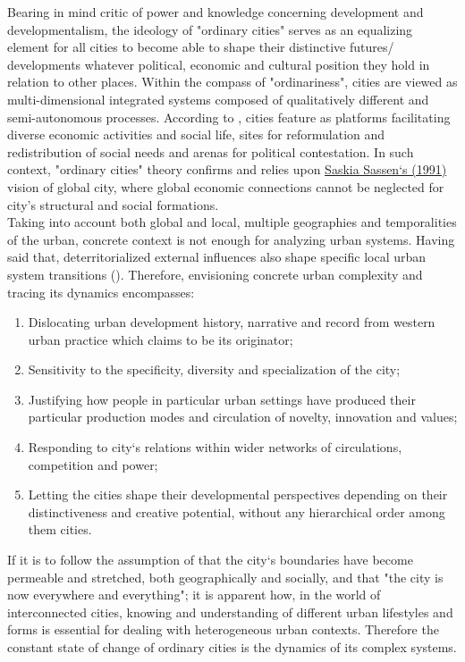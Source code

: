 \documentclass[11pt]{report}
\begin{document}
Bearing  in  mind  \href{Escobar}{\citealt{escobar_encountering_1995}} critic  of  power  and  knowledge  concerning  development  and developmentalism, the  ideology  of  "ordinary  cities"  serves as an equalizing  element  for  all  cities  to  become  able  to  shape  their  distinctive  futures/  developments whatever political, economic and cultural position they hold in relation to other places. 
Within  the  compass  of  "ordinariness",  cities are viewed  as  multi-dimensional  integrated  systems composed of qualitatively different and semi-autonomous processes.
According to  \href{Robinson}{\citealt{robinson_ordinary_2006}}, cities feature as  platforms facilitating  diverse  economic  activities  and  social  life,  sites for  reformulation  and redistribution of social needs and arenas for political contestation.
In such context, "ordinary cities" theory confirms and relies upon \href{Sassen}{Saskia Sassen‘s (1991)}  vision of global city, where global economic connections cannot be neglected for city's structural  and  social  formations.
\\

Taking into account both global and local, multiple geographies and temporalities of the urban, concrete context is not enough for analyzing urban systems.
Having said that, deterritorialized external influences also shape specific local urban system transitions (\href{Robinson}{\citealt{robinson_urban_2013}}).
Therefore, envisioning concrete urban complexity and tracing its dynamics encompasses:

\begin{enumerate}
\item Dislocating urban development history, narrative and record from western urban practice which claims to be its originator;
\item Sensitivity to the specificity, diversity and specialization of the city;
\item Justifying how  people  in particular urban settings  have  produced their  particular  production modes and circulation of novelty, innovation and values;
\item Responding to city‘s relations within wider networks of circulations, competition and power; 
\item Letting the  cities  shape their developmental perspectives depending  on  their  distinctiveness  and creative potential, without any hierarchical order among them cities.
\end{enumerate}

If it is to follow the assumption of \href{Amin}{\citealt{amin_globalization_1996}} that the city‘s boundaries have become permeable and stretched, both geographically and socially, and that "the city is  now  everywhere  and  everything";  it  is  apparent  how,  in  the  world  of interconnected cities, knowing and understanding of different urban lifestyles and forms is essential for dealing with heterogeneous urban contexts.
Therefore the constant state of change of ordinary cities is the dynamics  of its complex systems. 
\\
\end{document}
